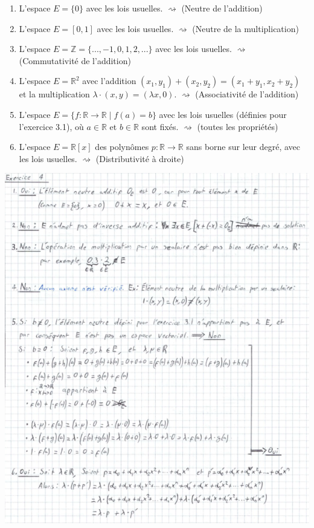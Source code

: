 \documentclass[a4paper, 10pt]{report}
\begin{document}
	\begin{enumerate}[label=\arabic*.]
		\item L'espace $E = \{0\}$ avec les lois usuelles. $\rightsquigarrow$ (Neutre de l'addition)
		\item L'espace $E = [0, 1]$ avec les lois usuelles. $\rightsquigarrow$ (Neutre de la multiplication)
		\item L'espace $E = \mathbb{Z} = \{..., -1, 0, 1, 2, ...\}$ avec les lois usuelles. $\rightsquigarrow$ (Commutativité de l'addition)
		\item L'espace $E = \mathbb{R}^2$ avec l'addition $(x_1, y_1) + (x_2, y_2) = (x_1 + y_1, x_2 + y_2)$ et la multiplication $\lambda \cdot (x, y) = (\lambda x, 0)$. $\rightsquigarrow$ (Associativité de l'addition)
		\item L'espace $E = \{f : \mathbb{R} \rightarrow \mathbb{R} \mid f(a) = b\}$ avec les lois usuelles (définies pour l'exercice 3.1), où $a \in \mathbb{R}$ et $b \in \mathbb{R}$ sont fixés. $\rightsquigarrow$ (toutes les propriétés)
		\item L'espace $E = \mathbb{R}[x]$ des polynômes $p : \mathbb{R} \rightarrow \mathbb{R}$ sans borne sur leur degré, avec les lois usuelles. $\rightsquigarrow$ (Distributivité à droite)
	\end{enumerate}
	
	
	\includegraphics{ex04.png}
\end{document}

